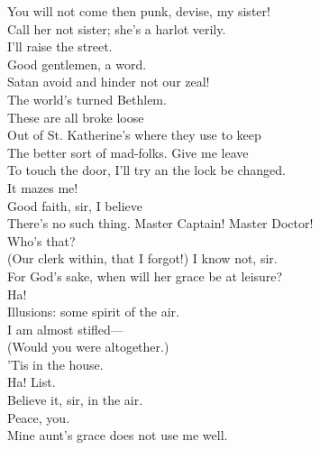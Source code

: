 \documentclass[a4paper,oneside,12pt]{memoir}
\begin{document}
\begin{drama*}
\kastrilspeaks You will not come then punk, devise, my sister!\\
\persecutionspeaks Call her not sister; she's a harlot verily.\\
\kastrilspeaks I'll raise the street.\\
\lovewitspeaks {} Good gentlemen, a word.\\
\persecutionspeaks Satan avoid and hinder not our zeal!\\
\lovewitspeaks The world's turned Bethlem.\\
\facespeaks {} These are all broke loose\\
Out of St. Katherine's where they use to keep\\
The better sort of mad-folks. Give me leave\\
To touch the door, I'll try an the lock be changed.\\
\lovewitspeaks It mazes me!\\
\facespeaks {} Good faith, sir, I believe\\
There's no such thing.
\dapperspeaks {} Master Captain! Master Doctor!\\
\lovewitspeaks Who's that?\\
\facespeaks {} (Our clerk within, that I forgot!) I know not, sir.\\
\dapperspeaks For God's sake, when will her grace be at leisure?\\
\facespeaks {} Ha!\\
Illusions: some spirit of the air.\\
\dapperspeaks {} I am almost stifled---\\
\facespeaks (Would you were altogether.)\\
\lovewitspeaks {} 'Tis in the house.\\
Ha! List.\\
\facespeaks {} Believe it, sir, in the air.\\
\lovewitspeaks {} Peace, you.\\
\dapperspeaks Mine aunt's grace does not use me well.\\

\end{drama*}
\end{document}
